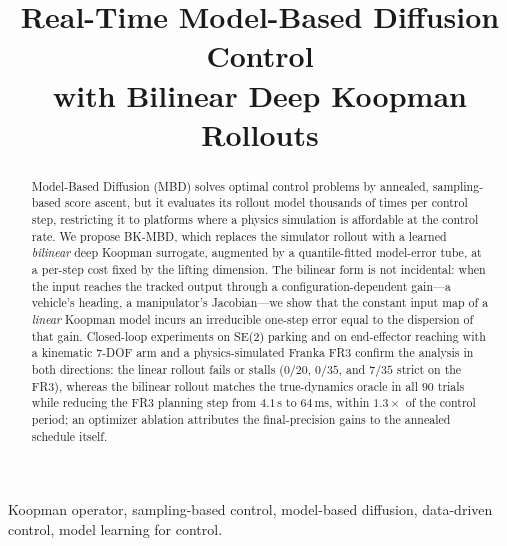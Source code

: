 \documentclass[lettersize,journal]{IEEEtran}
\theoremstyle{remark}
\newcommand{\todo}[1]{\textcolor{red}{\textbf{[TODO: #1]}}}
\newcommand{\bkmbd}{\textsc{BK-MBD}}
\begin{document}
\title{Real-Time Model-Based Diffusion Control\\
with Bilinear Deep Koopman Rollouts}


\maketitle

\begin{abstract}
Model-Based Diffusion (MBD) solves optimal control problems by annealed,
sampling-based score ascent, but it evaluates its rollout model thousands
of times per control step, restricting it to platforms where a physics
simulation is affordable at the control rate. We propose \bkmbd{}, which
replaces the simulator rollout with a learned \emph{bilinear} deep
Koopman surrogate, augmented by a quantile-fitted model-error tube, at a
per-step cost fixed by the lifting dimension. The bilinear form is not
incidental: when the input reaches the tracked output through a
configuration-dependent gain---a vehicle's heading, a manipulator's
Jacobian---we show that the constant input map of a \emph{linear}
Koopman model incurs an irreducible one-step error equal to the
dispersion of that gain. Closed-loop experiments on SE(2) parking and on
end-effector reaching with a kinematic $7$-DOF arm and a physics-simulated
Franka FR3 confirm the analysis in both directions: the linear rollout
fails or stalls ($0/20$, $0/35$, and $7/35$ strict on the FR3), whereas
the bilinear rollout matches the true-dynamics oracle in all $90$ trials
while reducing the FR3 planning step from $4.1$\,s to $64$\,ms, within
$1.3\times$ of the control period; an optimizer ablation attributes the
final-precision gains to the annealed schedule itself.
\end{abstract}

\begin{IEEEkeywords}
Koopman operator, sampling-based control, model-based diffusion, data-driven
control, model learning for control.
\end{IEEEkeywords}

\end{document}
